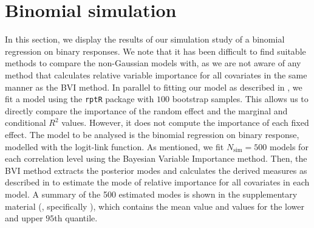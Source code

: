 \section{Binomial simulation}
In this section, we display the results of our simulation study of a binomial regression on binary responses. We note that it has been difficult to find suitable methods to compare the non-Gaussian models with, as we are not aware of any method that calculates relative variable importance for all covariates in the same manner as the BVI method. In parallel to fitting our model as described in , we fit a model using the \texttt{rptR} package with $100$ bootstrap samples. This allows us to directly compare the importance of the random effect and the marginal and conditional $R^2$ values. However, it does not compute the importance of each fixed effect. The model to be analysed is the binomial regression on binary response, modelled with the logit-link function. As mentioned, we fit \( N_{\text{sim}} = 500 \) models for each correlation level using the Bayesian Variable Importance method. Then, the BVI method extracts the posterior modes and calculates the derived measures as described in  to estimate the mode of relative importance for all covariates in each model. A summary of the 500 estimated modes is shown in the supplementary material (, specifically ), which contains the mean value and values for the lower and upper $95$th quantile.
